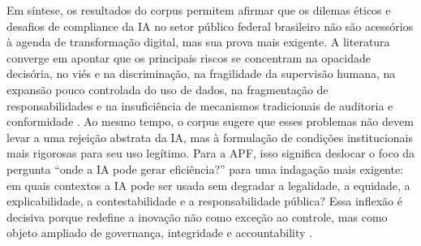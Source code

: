 \documentclass[12pt,a4paper]{article}
\begin{document}
Em síntese, os resultados do corpus permitem afirmar que os dilemas éticos e desafios de compliance da IA no setor público federal brasileiro não são acessórios à agenda de transformação digital, mas sua prova mais exigente. A literatura converge em apontar que os principais riscos se concentram na opacidade decisória, no viés e na discriminação, na fragilidade da supervisão humana, na expansão pouco controlada do uso de dados, na fragmentação de responsabilidades e na insuficiência de mecanismos tradicionais de auditoria e conformidade \autocite{mkander2023auditing} \autocite{minkkinen2022continuous} \autocite{criado2024artificial}. Ao mesmo tempo, o corpus sugere que esses problemas não devem levar a uma rejeição abstrata da IA, mas à formulação de condições institucionais mais rigorosas para seu uso legítimo. Para a APF, isso significa deslocar o foco da pergunta “onde a IA pode gerar eficiência?” para uma indagação mais exigente: em quais contextos a IA pode ser usada sem degradar a legalidade, a equidade, a explicabilidade, a contestabilidade e a responsabilidade pública? Essa inflexão é decisiva porque redefine a inovação não como exceção ao controle, mas como objeto ampliado de governança, integridade e accountability \autocite{sigfrids2022how} \autocite{batool2025ai} \autocite{goulart2025processos}.
\end{document}
